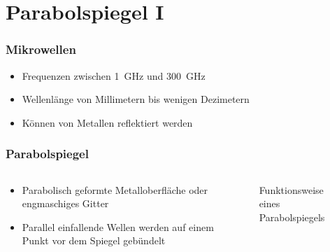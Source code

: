 
\section{Parabolspiegel I}
\label{section:parabolspiegel_1}
\begin{frame}%

\frametitle{Mikrowellen}
\begin{itemize}
  \item Frequenzen zwischen \qty{1}{\giga\hertz} und \qty{300}{\giga\hertz}
  \item Wellenlänge von Millimetern bis wenigen Dezimetern
  \item Können von Metallen reflektiert werden 
  \end{itemize}

\end{frame}

\begin{frame}
\frametitle{Parabolspiegel}
\begin{columns}
    \begin{column}{0.48\textwidth}
    \begin{itemize}
  \item Parabolisch geformte Metalloberfläche oder engmaschiges Gitter
  \item Parallel einfallende Wellen werden auf einem Punkt vor dem Spiegel gebündelt
  \end{itemize}

    \end{column}
   \begin{column}{0.48\textwidth}
       
\begin{figure}
    \caption{\scriptsize Funktionsweise eines Parabolspiegels}
    \label{e_parabolspiegel_funktion}
\end{figure}


   \end{column}
\end{columns}

\end{frame}

